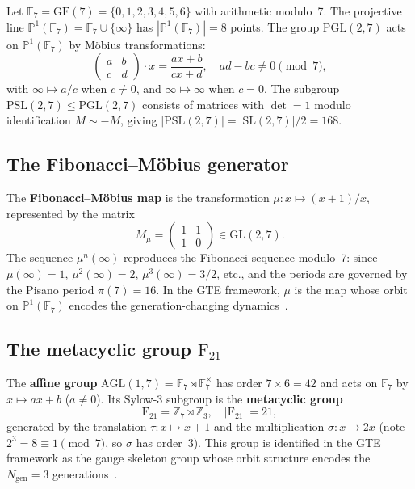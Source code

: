 \documentclass[11pt]{article}
\theoremstyle{remark}
\newcommand{\PSLtwo}{\ensuremath{\mathrm{PSL}(2,7)}}
\newcommand{\PGLtwo}{\ensuremath{\mathrm{PGL}(2,7)}}
\newcommand{\FineSeven}{\ensuremath{\mathrm{F}_{21}}}
\newcommand{\Zcyc}[1]{\ensuremath{\mathbb{Z}_{#1}}}
\newcommand{\ProjLine}{\ensuremath{\mathbb{P}^1(\mathbb{F}_7)}}
\begin{document}
Let $\mathbb{F}_7 = \mathrm{GF}(7) = \{0,1,2,3,4,5,6\}$ with arithmetic
modulo~7.
The projective line $\ProjLine = \mathbb{F}_7 \cup \{\infty\}$ has
$|\ProjLine| = 8$ points.
The group $\mathrm{PGL}(2,7)$ acts on $\ProjLine$ by Möbius transformations:
\begin{equation}
  \begin{pmatrix} a & b \\ c & d \end{pmatrix} \cdot x
  = \frac{ax+b}{cx+d}, \quad ad - bc \neq 0 \pmod{7},
\end{equation}
with $\infty \mapsto a/c$ when $c \neq 0$, and $\infty \mapsto \infty$ when
$c = 0$.
The subgroup $\PSLtwo \leq \PGLtwo$ consists of matrices with $\det = 1$ modulo
identification $M \sim -M$, giving $|\PSLtwo| = |\mathrm{SL}(2,7)|/2 = 168$.

\subsection{The Fibonacci--Möbius generator}

The \textbf{Fibonacci--Möbius map} is the transformation $\mu: x \mapsto (x+1)/x$,
represented by the matrix
\begin{equation}
  M_\mu = \begin{pmatrix} 1 & 1 \\ 1 & 0 \end{pmatrix} \in \mathrm{GL}(2,7).
\end{equation}
The sequence $\mu^n(\infty)$ reproduces the Fibonacci sequence modulo~7: since
$\mu(\infty) = 1$, $\mu^2(\infty) = 2$, $\mu^3(\infty) = 3/2$, etc., and the
periods are governed by the Pisano period $\pi(7) = 16$.
In the GTE framework, $\mu$ is the map whose orbit on $\ProjLine$ encodes the
generation-changing dynamics~\cite{SpivackGTEMobius,SpivackGTECompleteFramework}.

\subsection{The metacyclic group \texorpdfstring{$\FineSeven$}{F21}}

The \textbf{affine group} $\mathrm{AGL}(1,7) = \mathbb{F}_7 \rtimes \mathbb{F}_7^\times$
has order $7 \times 6 = 42$ and acts on $\mathbb{F}_7$ by $x \mapsto ax + b$
($a \neq 0$).
Its Sylow-3 subgroup is the \textbf{metacyclic group}
\begin{equation}
  \FineSeven = \Zcyc{7} \rtimes \Zcyc{3},
  \quad |\FineSeven| = 21,
\end{equation}
generated by the translation $\tau: x \mapsto x+1$ and the multiplication
$\sigma: x \mapsto 2x$ (note $2^3 = 8 \equiv 1 \pmod{7}$, so $\sigma$ has
order~3).
This group is identified in the GTE framework as the gauge skeleton group whose
orbit structure encodes the $N_{\mathrm{gen}} = 3$ generations~\cite{SpivackGTEMobius}.
\end{document}
